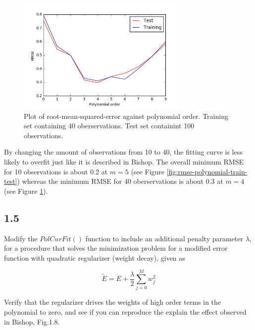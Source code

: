 \documentclass[a4paper]{article}
\begin{document}
\begin{figure}[h!]
\begin{center}
\includegraphics[width=0.75\textwidth]{Images/rmse_polynomial_order_40.png}
\caption{Plot of root-mean-squared-error against polynomial order. Training set containing 40 oberservations. Test set containint 100 observations.}
\label{fig:rmse-polynomial-train-test-40}
\end{center}
\end{figure}

By changing the amount of observations from 10 to 40, the fitting curve is less likely to overfit just like it is described in Bishop. The overall minimum RMSE for 10 observations is about 0.2 at $m = 5$ (see Figure \ref{fig:rmse-polynomial-train-test}) whereas the minimum RMSE for 40 oberservations is about 0.3 at $m = 4$(see Figure \ref{fig:rmse-polynomial-train-test-40}).

\newpage

\subsection*{1.5}

Modify the $PolCurFit()$ function to include an additional penalty parameter $\lambda$, for a procedure that solves the minimization problem for a modified error function with quadratic regularizer (weight decay), given as 

\begin{equation}
	\widetilde{E} = E + \frac{\lambda}{2} \sum_{j = 0}^M w_j^2
\end{equation}

Verify that the regularizer drives the weights of high order terms in the polynomial to zero, and see if you can reproduce the explain the effect observed in Bishop, Fig.1.8.\\
\end{document}
